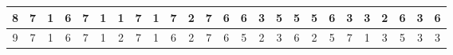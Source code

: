 \begin{sidewaystable}[]
\begin{tabular}{|c|c|c|c|c|c|c|c|c|c|c|c|c|c|c|c|c|c|c|c|c|c|c|c|c|}
    8       & 7                                               & 1                                               & 6                                               & 7                                               & 1                                               & 1                                               & 7                                               & 1                                               & 7                                               & 2                                                & 7                                                & 6                                                 &    6                                               & 3                                               & 5                                               & 5                                               & 5                                               & 6                                               & 3                                               & 3                                               & 2                                               & 6                                                & 3                                                & 6                                                \\ \hline
    9       & 7                                               & 1                                               & 6                                               & 7                                               & 1                                               & 2                                               & 7                                               & 1                                               & 6                                               & 2                                                & 7                                                & 6                                                 &    5                                               & 2                                               & 3                                               & 6                                               & 2                                               & 5                                               & 7                                               & 1                                               & 3                                               & 5                                                & 3                                                & 3                                                \\ \hline

\end{tabular}
\end{sidewaystable}
